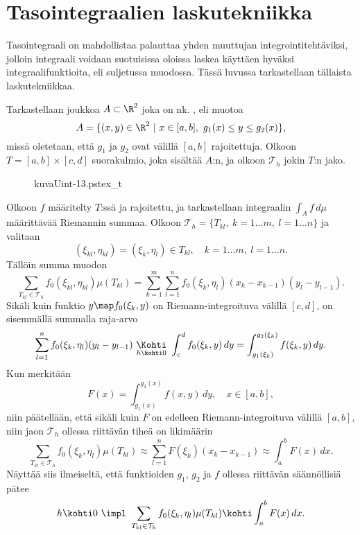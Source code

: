 \section{Tasointegraalien laskutekniikka} \label{tasointegraalien laskutekniikka}
\alku
{}

Tasointegraali on mahdollistaa palauttaa yhden muuttujan integrointitehtäviksi, jolloin 
integraali voidaan suotuisissa oloissa laskea käyttäen hyväksi integraalifunktioita, eli 
suljetussa muodossa. Tässä luvussa tarkastellaan tällaista laskutekniikkaa.

%
Tarkastellaan joukkoa $A\subset\R^2$ joka on nk. , eli muotoa
\[
A=\{(x,y)\in\R^2 \ | \ x\in [a,b], \ g_1(x)\leq y\leq g_2(x)\},
\]
missä oletetaan, että $g_1$ ja $g_2$ ovat välillä $[a,b]$ rajoitettuja. Olkoon 
$T=[a,b]\times [c,d]$ suorakulmio, joka sisältää $A$:n, ja olkoon $\mathcal{T}_h$ jokin $T$:n
jako.
\begin{figure}[H]
\begin{center}
{kuvaUint-13.pstex_t}
\end{center}
\end{figure}
Olkoon $f$ määritelty $T$:ssä ja rajoitettu, ja tarkastellaan integraalin $\int_A f\, d\mu$
määrittävää Riemannin summaa. Olkoon $\mathcal{T}_h=\{T_{kl},\ k=1 \ldots m,\ l=1 \ldots n\}$
ja valitaan
\[
(\xi_{kl},\eta_{kl})=(\xi_k,\eta_l)\in T_{kl},\quad k=1 \ldots m,\ l=1 \ldots n.
\]
Tällöin summa muodon
\[
\sum_{T_{kl}\in\mathcal{T}_h} f_0(\xi_{kl},\eta_{kl})\mu(T_{kl})
= \sum_{k=1}^m\sum_{l=1}^n f_0(\xi_k,\eta_l)(x_k-x_{k-1})(y_l-y_{l-1}).
\]
Sikäli kuin funktio $y \map f_0(\xi_k,y)$ on Riemann-integroituva välillä $[c,d]$, on
sisemmällä summalla raja-arvo
\[
\sum_{l=1}^n f_0(\xi_k,\eta_l)(y_l-y_{l-1})\ 
                  \underset{h\kohti 0}{\Kohti}\ \int_c^d f_0(\xi_k,y)\,dy
                         = \int_{g_1(\xi_k)}^{g_2(\xi_k)} f(\xi_k,y)\,dy.
\]
Kun merkitään
\[
F(x)=\int_{g_1(x)}^{g_2(x)} f(x,y)\, dy,\quad x\in [a,b],
\]
niin päätellään, että sikäli kuin $F$ on edelleen Riemann-integroituva välillä $[a,b]$, niin
jaon $\mathcal{T}_h$ ollessa riittävän tiheä on likimäärin
\[
\sum_{T_{kl}\in\mathcal{T}_h} f_0(\xi_k,\eta_l)\mu(T_{kl}) 
            \approx \sum_{l=1}^n F(\xi_k)(x_k-x_{k-1}) \approx \int_a^b F(x)\,dx.
\]
Näyttää siis ilmeiseltä, että funktioiden $g_1$, $g_2$ ja $f$ ollessa riittävän säännöllisiä
pätee
\[
h\kohti 0 \ \impl \ 
            \sum_{T_{kl}\in\mathcal{T}_h} f_0(\xi_k,\eta_l)\mu(T_{kl})\kohti\int_a^b F(x)\,dx.
\]
